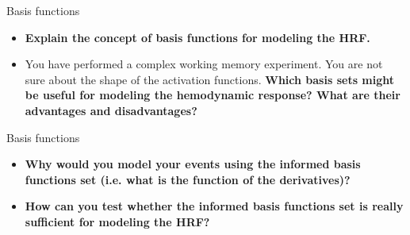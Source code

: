 \documentclass{beamer}
\begin{document}
\begin{frame}{Basis functions}
  \begin{itemize}
    \item \textbf{Explain the concept of basis functions for modeling the HRF.}


    \bigskip
    \item You have performed a complex working memory experiment. You are not sure about the shape of the activation functions. \textbf{Which basis sets might be useful for modeling the hemodynamic response? What are their advantages and disadvantages?}

  \end{itemize}  
\end{frame}


\begin{frame}{Basis functions}
  \begin{itemize}
    \item \textbf{Why would you model your events using the informed basis functions set (i.e. what is the function of the derivatives)?}


    \bigskip       
    \item \textbf{How can you test whether the informed basis functions set is really sufficient for modeling the HRF?}

  \end{itemize}
\end{frame}
\end{document}
